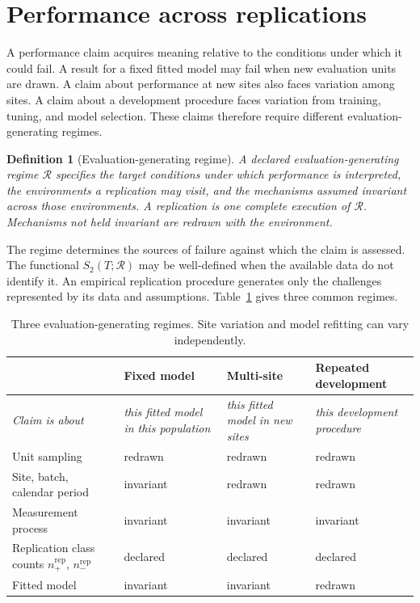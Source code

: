 \documentclass[11pt]{article}
\newcommand{\Regime}{\mathcal{R}}
\newtheorem{definition}{Definition}
\theoremstyle{remark}
\begin{document}
\section{Performance across replications}
\label{sec:regime}

A performance claim acquires meaning relative to the conditions under which it could fail. A result for a fixed fitted model may fail when new evaluation units are drawn. A claim about performance at new sites also faces variation among sites. A claim about a development procedure faces variation from training, tuning, and model selection. These claims therefore require different evaluation-generating regimes.

\begin{definition}[Evaluation-generating regime]
A declared evaluation-generating regime $\Regime$ specifies the target conditions under which performance is interpreted, the environments a replication may visit, and the mechanisms assumed invariant across those environments. A replication is one complete execution of $\Regime$. Mechanisms not held invariant are redrawn with the environment.
\end{definition}

The regime determines the sources of failure against which the claim is assessed. The functional $S_2(T;\Regime)$ may be well-defined when the available data do not identify it. An empirical replication procedure generates only the challenges represented by its data and assumptions. Table~\ref{tab:regimes} gives three common regimes.

\begin{table}[ht]
\centering
\caption{Three evaluation-generating regimes. Site variation and model refitting can vary independently.}
\label{tab:regimes}
\begin{tabularx}{\textwidth}{@{}l>{\centering\arraybackslash}X>{\centering\arraybackslash}X>{\centering\arraybackslash}X@{}}
\toprule
& Fixed model & Multi-site & Repeated development \\
\midrule
\emph{Claim is about} & \emph{this fitted model in this population} & \emph{this fitted model in new sites} & \emph{this development procedure} \\
\midrule
Unit sampling & redrawn & redrawn & redrawn \\
Site, batch, calendar period & invariant & redrawn & redrawn \\
Measurement process & invariant & invariant & invariant \\
Replication class counts $n_+^{\mathrm{rep}}$, $n_-^{\mathrm{rep}}$ & declared & declared & declared \\
Fitted model & invariant & invariant & redrawn \\
\bottomrule
\end{tabularx}
\end{table}
\end{document}
